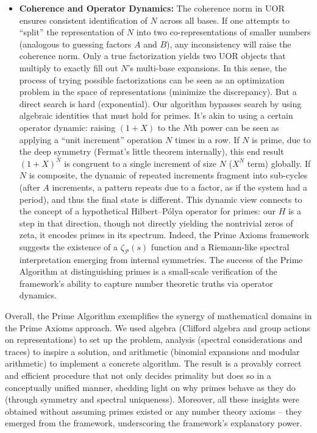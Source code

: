 \documentclass[11pt]{article}
\begin{document}
{\begin{itemize}
    \item \textbf{Coherence and Operator Dynamics:} The coherence norm in UOR ensures consistent identification of $N$ across all bases. If one attempts to “split” the representation of $N$ into two co-representations of smaller numbers (analogous to guessing factors $A$ and $B$), any inconsistency will raise the coherence norm. Only a true factorization yields two UOR objects that multiply to exactly fill out $N$’s multi-base expansions. In this sense, the process of trying possible factorizations can be seen as an optimization problem in the space of representations (minimize the discrepancy). But a direct search is hard (exponential). Our algorithm bypasses search by using algebraic identities that must hold for primes. It’s akin to using a certain operator dynamic: raising $(1+X)$ to the $N$th power can be seen as applying a “unit increment” operation $N$ times in a row. If $N$ is prime, due to the deep symmetry (Fermat’s little theorem internally), this end result $(1+X)^N$ is congruent to a single increment of size $N$ ($X^N$ term) globally. If $N$ is composite, the dynamic of repeated increments fragment into sub-cycles (after $A$ increments, a pattern repeats due to a factor, as if the system had a period), and thus the final state is different. This dynamic view connects to the concept of a hypothetical Hilbert–Pólya operator for primes: our $H$ is a step in that direction, though not directly yielding the nontrivial zeros of zeta, it encodes primes in its spectrum. Indeed, the Prime Axioms framework suggests the existence of a $\zeta_{\mathcal{P}}(s)$ function and a Riemann-like spectral interpretation emerging from internal symmetries. The success of the Prime Algorithm at distinguishing primes is a small-scale verification of the framework’s ability to capture number theoretic truths via operator dynamics.
\end{itemize}

Overall, the Prime Algorithm exemplifies the synergy of mathematical domains in the Prime Axioms approach. We used algebra (Clifford algebra and group actions on representations) to set up the problem, analysis (spectral considerations and traces) to inspire a solution, and arithmetic (binomial expansions and modular arithmetic) to implement a concrete algorithm. The result is a provably correct and efficient procedure that not only decides primality but does so in a conceptually unified manner, shedding light on why primes behave as they do (through symmetry and spectral uniqueness). Moreover, all these insights were obtained without assuming primes existed or any number theory axioms – they emerged from the framework, underscoring the framework’s explanatory power.

}
\end{document}
